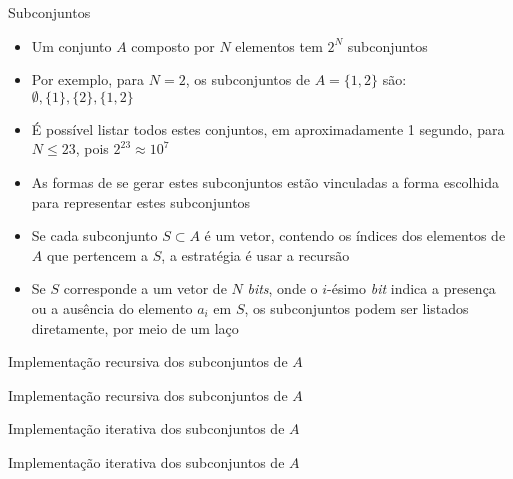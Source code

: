 \begin{frame}[fragile]{Subconjuntos}

    \begin{itemize}
        \item Um conjunto $A$ composto por $N$ elementos tem $2^N$ subconjuntos

        \item Por exemplo, para $N = 2$, os subconjuntos de $A = \lbrace 1, 2\rbrace$ são:
            $\emptyset, \lbrace 1\rbrace, \lbrace 2\rbrace, \lbrace 1, 2\rbrace$

        \item É possível listar todos estes conjuntos, em aproximadamente 1 segundo, para
            $N\leq 23$, pois $2^{23} \approx 10^7$

        \item As formas de se gerar estes subconjuntos estão vinculadas a forma escolhida para
            representar estes subconjuntos

        \item Se cada subconjunto $S\subset A$ é um vetor, contendo os índices dos elementos de
            $A$ que pertencem a $S$, a estratégia é usar a recursão

        \item Se $S$ corresponde a um vetor de $N$ \textit{bits}, onde o $i$-ésimo \textit{bit}
            indica a presença ou a ausência do elemento $a_i$ em $S$, os subconjuntos podem ser
            listados diretamente, por meio de um laço 
    \end{itemize}

\end{frame}

\begin{frame}[fragile]{Implementação recursiva dos subconjuntos de $A$}
\end{frame}

\begin{frame}[fragile]{Implementação recursiva dos subconjuntos de $A$}
\end{frame}

\begin{frame}[fragile]{Implementação iterativa dos subconjuntos de $A$}
\end{frame}

\begin{frame}[fragile]{Implementação iterativa dos subconjuntos de $A$}
\end{frame}

